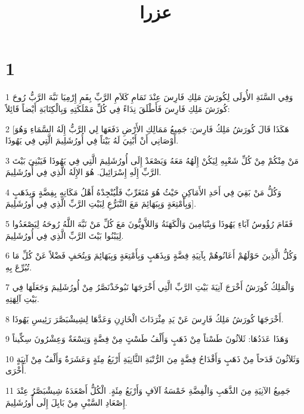 

\title{عزرا}


\chapter{1}

\par 1 وَفِي السَّنَةِ الأُولَى لِكُورَشَ مَلِكِ فَارِسَ عِنْدَ تَمَامِ كَلاَمِ الرَّبِّ بِفَمِ إِرْمِيَا نَبَّهَ الرَّبُّ رُوحَ كُورَشَ مَلِكِ فَارِسَ فَأَطْلَقَ نِدَاءً فِي كُلِّ مَمْلَكَتِهِ وَبِالْكِتَابَةِ أَيْضاً قَائِلاً:
\par 2 [هَكَذَا قَالَ كُورَشُ مَلِكُ فَارِسَ: جَمِيعُ مَمَالِكِ الأَرْضِ دَفَعَهَا لِي الرَّبُّ إِلَهُ السَّمَاءِ وَهُوَ أَوْصَانِي أَنْ أَبْنِيَ لَهُ بَيْتاً فِي أُورُشَلِيمَ الَّتِي فِي يَهُوذَا.
\par 3 مَنْ مِنْكُمْ مِنْ كُلِّ شَعْبِهِ لِيَكُنْ إِلَهُهُ مَعَهُ وَيَصْعَدْ إِلَى أُورُشَلِيمَ الَّتِي فِي يَهُوذَا فَيَبْنِيَ بَيْتَ الرَّبِّ إِلَهِ إِسْرَائِيلَ. هُوَ الإِلَهُ الَّذِي فِي أُورُشَلِيمَ.
\par 4 وَكُلُّ مَنْ بَقِيَ فِي أَحَدِ الأَمَاكِنِ حَيْثُ هُوَ مُتَغَرِّبٌ فَلْيُنْجِدْهُ أَهْلُ مَكَانِهِ بِفِضَّةٍ وَبِذَهَبٍ وَبِأَمْتِعَةٍ وَبِبَهَائِمَ مَعَ التَّبَرُّعِ لِبَيْتِ الرَّبِّ الَّذِي فِي أُورُشَلِيمَ].
\par 5 فَقَامَ رُؤُوسُ آبَاءِ يَهُوذَا وَبِنْيَامِينَ وَالْكَهَنَةُ وَاللاَّوِيُّونَ مَعَ كُلِّ مَنْ نَبَّهَ اللَّهُ رُوحَهُ لِيَصْعَدُوا لِيَبْنُوا بَيْتَ الرَّبِّ الَّذِي فِي أُورُشَلِيمَ.
\par 6 وَكُلُّ الَّذِينَ حَوْلَهُمْ أَعَانُوهُمْ بِآنِيَةِ فِضَّةٍ وَبِذَهَبٍ وَبِأَمْتِعَةٍ وَبِبَهَائِمَ وَبِتُحَفٍ فَضْلاً عَنْ كُلِّ مَا تُبُرِّعَ بِهِ.
\par 7 وَالْمَلِكُ كُورَشُ أَخْرَجَ آنِيَةَ بَيْتِ الرَّبِّ الَّتِي أَخْرَجَهَا نَبُوخَذْنَصَّرُ مِنْ أُورُشَلِيمَ وَجَعَلَهَا فِي بَيْتِ آلِهَتِهِ.
\par 8 أَخْرَجَهَا كُورَشُ مَلِكُ فَارِسَ عَنْ يَدِ مِثْرَدَاثَ الْخَازِنِ وَعَدَّهَا لِشِيشْبَصَّرَ رَئِيسِ يَهُوذَا.
\par 9 وَهَذَا عَدَدُهَا: ثَلاَثُونَ طَسْتاً مِنْ ذَهَبٍ وَأَلْفُ طَسْتٍ مِنْ فِضَّةٍ وَتِسْعَةٌ وَعِشْرُونَ سِكِّيناً
\par 10 وَثَلاَثُونَ قَدَحاً مِنْ ذَهَبٍ وَأَقْدَاحُ فِضَّةٍ مِنَ الرُّتْبَةِ الثَّانِيَةِ أَرْبَعُ مِئَةٍ وَعَشَرَةٌ وَأَلْفٌ مِنْ آنِيَةٍ أُخْرَى.
\par 11 جَمِيعُ الآنِيَةِ مِنَ الذَّهَبِ وَالْفِضَّةِ خَمْسَةُ آلاَفٍ وَأَرْبَعُ مِئَةٍ. الْكُلُّ أَصْعَدَهُ شِيشْبَصَّرُ عِنْدَ إِصْعَادِ السَّبْيِ مِنْ بَابِلَ إِلَى أُورُشَلِيمَ.

